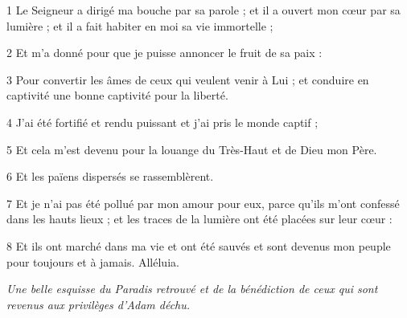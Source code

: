 \par 1 Le Seigneur a dirigé ma bouche par sa parole ; et il a ouvert mon cœur par sa lumière ; et il a fait habiter en moi sa vie immortelle ;
\par 2 Et m'a donné pour que je puisse annoncer le fruit de sa paix :
\par 3 Pour convertir les âmes de ceux qui veulent venir à Lui ; et conduire en captivité une bonne captivité pour la liberté.
\par 4 J'ai été fortifié et rendu puissant et j'ai pris le monde captif ;
\par 5 Et cela m'est devenu pour la louange du Très-Haut et de Dieu mon Père.
\par 6 Et les païens dispersés se rassemblèrent.
\par 7 Et je n'ai pas été pollué par mon amour pour eux, parce qu'ils m'ont confessé dans les hauts lieux ; et les traces de la lumière ont été placées sur leur cœur :
\par 8 Et ils ont marché dans ma vie et ont été sauvés et sont devenus mon peuple pour toujours et à jamais. Alléluia.


\par \textit{Une belle esquisse du Paradis retrouvé et de la bénédiction de ceux qui sont revenus aux privilèges d'Adam déchu.}

